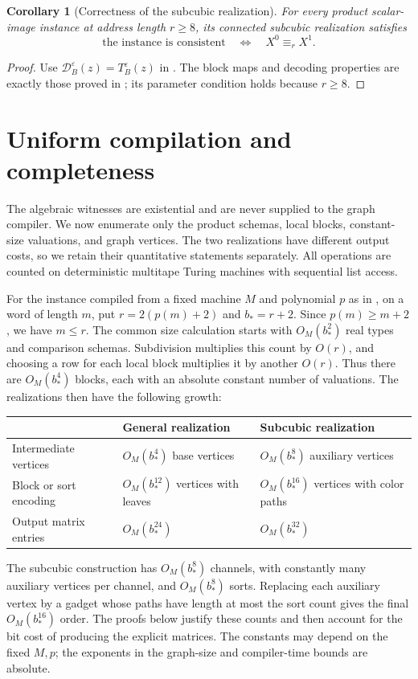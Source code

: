 \documentclass[11pt]{article}
\newtheorem{corollary}[theorem]{Corollary}
\theoremstyle{definition}
\newcommand{\eps}{\varepsilon}
\begin{document}
\begin{corollary}[Correctness of the subcubic realization]
\label{cor:subcubic-game}
For every product scalar-image instance at address length \(r\ge8\),
its connected subcubic realization satisfies
\[
 \text{the instance is consistent}\quad\Longleftrightarrow\quad
 X^0\equiv_r X^1.
\]
\end{corollary}
\begin{proof}
Use \(\mathcal D_B^\eps(z)=T_B^\eps(z)\) in
. The block maps and decoding properties are
exactly those proved in ; its parameter
condition holds because \(r\ge8\).
\end{proof}

\section{Uniform compilation and completeness}\label{uniform:section}

The algebraic witnesses are existential and are never supplied to the
graph compiler. We now enumerate only the product schemas, local blocks,
constant-size valuations, and graph vertices. The two realizations have
different output costs, so we retain their quantitative statements
separately. All operations are counted on deterministic multitape
Turing machines with sequential list access.

For the instance compiled from a fixed machine $M$ and polynomial $p$
as in , on a word of length $m$, put
$r=2(p(m)+2)$ and $b_*=r+2$. Since $p(m)\ge m+2$, we have $m\le r$.
The common size calculation starts with $O_M(b_*^2)$ real types and
comparison schemas. Subdivision
multiplies this count by $O(r)$, and choosing a row for each local
block multiplies it by another $O(r)$. Thus there are $O_M(b_*^4)$
blocks, each with an absolute constant number of valuations.
The realizations then have the following growth:
\begin{center}
\begin{tabular}{@{}lll@{}}
\toprule
 & General realization & Subcubic realization\\
\midrule
Intermediate vertices & $O_M(b_*^4)$ base vertices
 & $O_M(b_*^8)$ auxiliary vertices\\
Block or sort encoding & $O_M(b_*^{12})$ vertices with leaves
 & $O_M(b_*^{16})$ vertices with color paths\\
Output matrix entries & $O_M(b_*^{24})$ & $O_M(b_*^{32})$\\
\bottomrule
\end{tabular}
\end{center}
The subcubic construction has $O_M(b_*^8)$ channels, with constantly
many auxiliary vertices per channel, and $O_M(b_*^8)$ sorts.
Replacing each auxiliary vertex by a gadget whose paths have length
at most the sort count gives the final $O_M(b_*^{16})$ order.
The proofs below justify these counts
and then account for the bit cost of producing the explicit matrices.
The constants may depend on the fixed $M,p$; the exponents in the
graph-size and compiler-time bounds are absolute.
\end{document}
